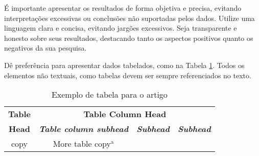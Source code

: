 É importante apresentar os resultados de forma objetiva e precisa, evitando interpretações excessivas ou conclusões não suportadas pelos dados. Utilize uma linguagem clara e concisa, evitando jargões excessivos. Seja transparente e honesto sobre seus resultados, destacando tanto os aspectos positivos quanto os negativos da sua pesquisa.

Dê preferência para apresentar dados tabelados, como na Tabela \ref{tab:resultados}. Todos os elementos não textuais, como tabelas devem ser sempre referenciados no texto.

\begin{table}[htbp]
\caption{Exemplo de tabela para o artigo}
\begin{center}
\begin{tabular}{|c|c|c|c|}
\hline
\textbf{Table}&\multicolumn{3}{|c|}{\textbf{Table Column Head}} \\
\cline{2-4} 
\textbf{Head} & \textbf{\textit{Table column subhead}}& \textbf{\textit{Subhead}}& \textbf{\textit{Subhead}} \\
\hline
copy& More table copy$^{\mathrm{a}}$& &  \\
\hline
\end{tabular}
\label{tab:resultados}
\end{center}
\end{table}